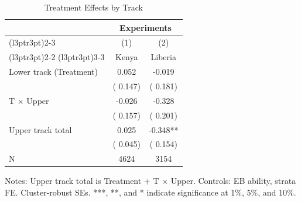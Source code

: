 \begin{table}[!h]
\centering
\caption{Treatment Effects by Track}
\label{tab:upper_lower}
\begin{threeparttable}
\begin{tabular}[t]{lcc}
\toprule
\multicolumn{1}{c}{ } & \multicolumn{2}{c}{Experiments} \\
\cmidrule(l{3pt}r{3pt}){2-3}
\multicolumn{1}{c}{ } & \multicolumn{1}{c}{(1)} & \multicolumn{1}{c}{(2)} \\
\cmidrule(l{3pt}r{3pt}){2-2} \cmidrule(l{3pt}r{3pt}){3-3}
 & \multicolumn{1}{c}{Kenya} & \multicolumn{1}{c}{Liberia} \\
\midrule
Lower track (Treatment) &   0.052 &  -0.019 \\
 & (  0.147) & (  0.181) \\
\addlinespace
T $\times$ Upper &  -0.026 &  -0.328 \\
 & (  0.157) & (  0.201) \\
\addlinespace
Upper track total &   0.025 &  -0.348** \\
 & (  0.045) & (  0.154) \\
\addlinespace
N & 4624 & 3154 \\
\bottomrule
\end{tabular}
\begin{tablenotes}[para]
\item Notes: Upper track total is Treatment + T $\times$ Upper. Controls: EB ability, strata FE. Cluster-robust SEs. ***, **, and * indicate significance at 1\%, 5\%, and 10\%.
\end{tablenotes}
\end{threeparttable}
\end{table}
